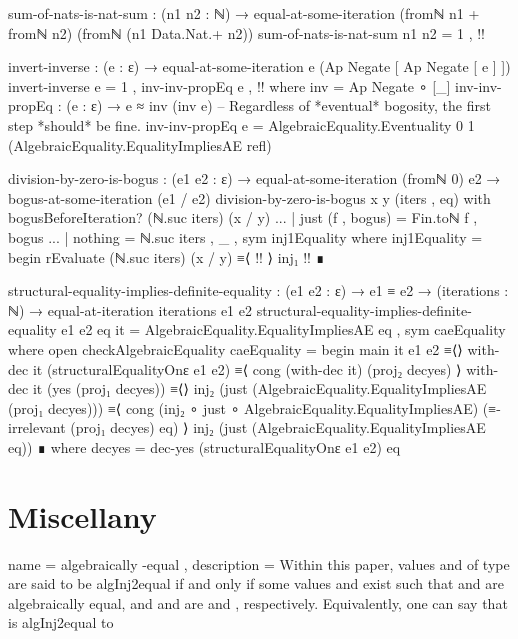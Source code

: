 \documentclass{report}
\begin{document}
\begin{code}
  sum-of-nats-is-nat-sum :
    (n1 n2 : ℕ) →
    equal-at-some-iteration (fromℕ n1 + fromℕ n2) (fromℕ (n1 Data.Nat.+ n2))
  sum-of-nats-is-nat-sum n1 n2 = 1 , {!!}

  invert-inverse : (e : ε) → equal-at-some-iteration e (Ap Negate [ Ap Negate [ e ] ])
  invert-inverse e = 1 , inv-inv-propEq e , {!!}
    where
    inv = Ap Negate ∘ [_]
    inv-inv-propEq :
      (e : ε) →
      e ≈ inv (inv e)
    -- Regardless of *eventual* bogosity, the first step *should* be fine.
    inv-inv-propEq e =
      AlgebraicEquality.Eventuality 0 1 (AlgebraicEquality.EqualityImpliesAE refl)

  division-by-zero-is-bogus :
    (e1 e2 : ε) →
    equal-at-some-iteration (fromℕ 0) e2 →
    bogus-at-some-iteration (e1 / e2)
  division-by-zero-is-bogus x y (iters , eq) with bogusBeforeIteration? (ℕ.suc iters) (x / y)
  ... | just (f , bogus) = Fin.toℕ f , bogus
  ... | nothing = ℕ.suc iters , _ , sym inj1Equality
    where
    inj1Equality = begin
      rEvaluate (ℕ.suc iters) (x / y)
        ≡⟨ {!!} ⟩
      inj₁ {!!} ∎

  structural-equality-implies-definite-equality :
    (e1 e2 : ε) →
    e1 ≡ e2 →
    (iterations : ℕ) →
    equal-at-iteration iterations e1 e2
  structural-equality-implies-definite-equality e1 e2 eq it =
    AlgebraicEquality.EqualityImpliesAE eq , sym caeEquality
    where
    open checkAlgebraicEquality
    caeEquality = begin
      main it e1 e2
        ≡⟨⟩
      with-dec it (structuralEqualityOnε e1 e2)
        ≡⟨ cong (with-dec it) (proj₂ decyes) ⟩
      with-dec it (yes (proj₁ decyes))
        ≡⟨⟩
      inj₂ (just (AlgebraicEquality.EqualityImpliesAE (proj₁ decyes)))
        ≡⟨ cong (inj₂ ∘ just ∘ AlgebraicEquality.EqualityImpliesAE)
                (≡-irrelevant (proj₁ decyes) eq) ⟩
      inj₂ (just (AlgebraicEquality.EqualityImpliesAE eq)) ∎
      where
      decyes = dec-yes (structuralEqualityOnε e1 e2) eq
\end{code}

\part{Miscellany}

\printbibliography{}

  { name = algebraically -equal
  , description = {Within this paper, values  and  of type    are said to be \gls{algInj2equal} if and only if some values  and  exist such that  and  are algebraically equal, and  and  are   and  , respectively.  Equivalently, one can say that  is \gls{algInj2equal} to }
  }
\end{document}
